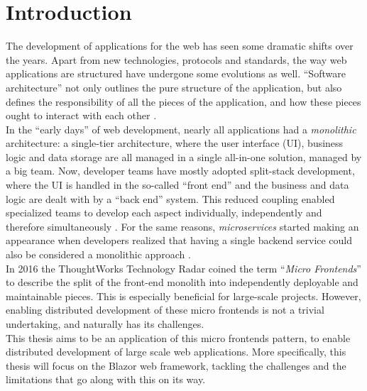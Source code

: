 
\section{Introduction}
\label{sec:introduction}


The development of applications for the web has seen some dramatic shifts over
the years. Apart from new technologies, protocols and standards, the way web
applications are structured have undergone some evolutions as well. ``Software
architecture'' not only outlines the pure structure of the application, but also
defines the responsibility of all the pieces of the application, and how these
pieces ought to interact with each other \autocite{Fedorov_etal_1998}.\\
In the ``early days'' of web development, nearly all applications had a
\textit{monolithic} architecture: a single-tier architecture, where the user
interface (UI), business logic and data storage are all managed in a single
all-in-one solution, managed by a big team. Now, developer teams have mostly
adopted split-stack development, where the UI is handled in the so-called
``front end'' and the business and data logic are dealt with by a ``back end''
system. This reduced coupling enabled specialized teams to develop
each aspect individually, independently and therefore simultaneously
\autocite{Dunkley_2016}. For the same reasons, \textit{microservices} started
making an appearance when developers realized that having a single backend
service could also be considered a monolithic approach
\autocite{Fowler_Microservices_2014}.\\
In 2016 the ThoughtWorks Technology Radar \autocite{ThoughtWorks_2020} coined
the term ``\textit{Micro Frontends}'' to describe the split of the front-end
monolith into independently deployable and maintainable pieces. This is
especially beneficial for large-scale projects. However, enabling distributed
development of these micro frontends is not a trivial undertaking, and naturally
has its challenges.\\

This thesis aims to be an application of this micro frontends pattern, to enable
distributed development of large scale web applications. More specifically, this
thesis will focus on the Blazor web framework, tackling the challenges and the
limitations that go along with this on its way.

